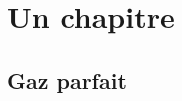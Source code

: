 \documentclass[
	a4paper,
	DIV16,
	10pt,
	cleardoublepage=empty,
        twoside=yes,
        BCOR=8.25mm
	]{scrbook}
\begin{document}
 \inibook

\chapter{Un chapitre}
\section{Gaz parfait}

\end{document}
